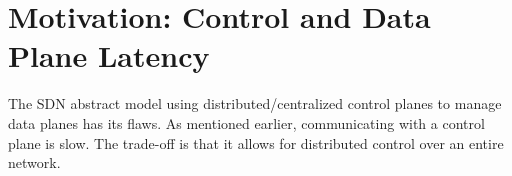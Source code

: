 %
%
%
%
%

\section{Motivation: Control and Data Plane Latency}

The SDN abstract model using distributed/centralized control
planes to manage data planes has its flaws.
As mentioned earlier, communicating with a control plane is slow.
The trade-off is that it allows for distributed control over an
entire network.

